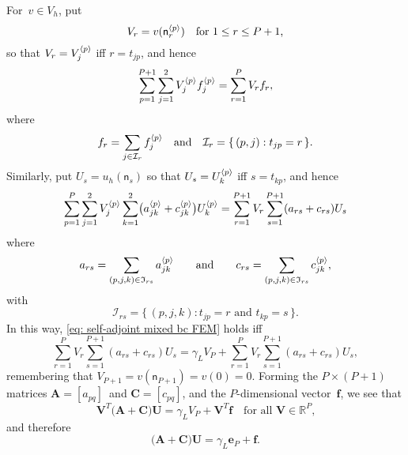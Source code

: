 For~$v\in V_h$, put
\[
V_r=v(\mathsf{n}^{\langle p\rangle}_r)\quad\text{for $1\le r\le P+1$,}
\]
so that $V_r=V^{\langle p\rangle}_j$ iff $r=t_{jp}$, and hence
\[
\sum_{p=1}^{P+1}\sum_{j=1}^2V^{\langle p\rangle}_jf^{\langle p\rangle}_j=\sum_{r=1}^PV_rf_r,
\]
where
\[
f_r=\sum_{j\in\mathcal{I}_r}f^{\langle p\rangle}_j
\quad\text{and}\quad
\mathcal{I}_r=\{\,(p,j):t_{jp}=r\,\}.
\]
Similarly, put $U_s=u_h(\mathsf{n}_s)$ so that $U_s=U^{\langle p\rangle}_k$ iff 
$s=t_{kp}$, and hence
\[
\sum_{p=1}^P\sum_{j=1}^2V^{\langle p\rangle}_j\sum_{k=1}^2
\bigl(a^{\langle p\rangle}_{jk}+c^{\langle p\rangle}_{jk}\bigr)U^{\langle p\rangle}_k
=\sum_{r=1}^{P+1}V_r\sum_{s=1}^{P+1}(a_{rs}+c_{rs})U_s
\]
where
\[
a_{rs}=\sum_{(p,j,k)\in\mathfrak{I}_{rs}}a^{\langle p\rangle}_{jk}
\qquad\text{and}\qquad
c_{rs}=\sum_{(p,j,k)\in\mathfrak{I}_{rs}} c^{\langle p\rangle}_{jk},
\]
with
\[
\mathcal{I}_{rs}=\{\,(p,j,k):\text{$t_{jp}=r$ and $t_{kp}=s$}\,\}.
\]
In this way, \eqref{eq: self-adjoint mixed bc FEM} holds iff
\[
\sum_{r=1}^PV_r\sum_{s=1}^{P+1}(a_{rs}+c_{rs})U_s=\gamma_LV_{P}
	+\sum_{r=1}^PV_r\sum_{s=1}^{P+1}(a_{rs}+c_{rs})U_s,
\]
remembering that $V_{P+1}=v(\mathsf{n}_{P+1})=v(0)=0$.  Forming the 
$P\times(P+1)$ matrices $\boldsymbol{A}=[a_{pq}]$~and 
$\boldsymbol{C}=[c_{pq}]$, and the $P$-dimensional vector~$\boldsymbol{f}$,
we see that
\begin{equation}\label{eq: VT(A+C)U}
\boldsymbol{V}^T\bigl(\boldsymbol{A}+\boldsymbol{C}\bigr)\boldsymbol{U}
    =\gamma_LV_P+\boldsymbol{V}^T\boldsymbol{f}
    \quad\text{for all $\boldsymbol{V}\in\mathbb{R}^P$,}
\end{equation}
and therefore
\begin{equation}\label{eq: A C f example}
\bigl(\boldsymbol{A}+\boldsymbol{C}\bigr)\boldsymbol{U}
    =\gamma_L\boldsymbol{e}_P+\boldsymbol{f}.
\end{equation}

